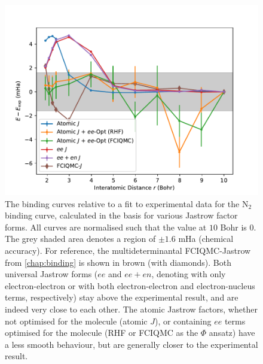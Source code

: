 \begin{figure}[htbp]
    \centering
    \includegraphics[width=\textwidth]{figures/universal/residuals}
    \caption{The binding curves relative to a fit to experimental data\supercite{leroyAccurate2006} for the N$_2$ binding curve, calculated in the \avtz basis for various Jastrow factor forms. All curves are normalised such that the value at $10$ Bohr is $0$. The grey shaded area denotes a region of $\pm 1.6$ mHa (chemical accuracy). For reference, the multideterminantal FCIQMC-Jastrow from \autoref{chap:binding} is shown in brown (with diamonds). Both universal Jastrow forms ($ee$ and $ee+en$, denoting with only electron-electron or with both electron-electron and electron-nucleus terms, respectively) stay above the experimental result, and are indeed very close to each other. The atomic Jastrow factors, whether not optimised for the molecule (atomic $J$), or containing $ee$ terms optimised for the molecule (RHF or FCIQMC as the $\Phi$ ansatz) have a less smooth behaviour, but are generally closer to the experimental result. }
    \label{fig:binding-universal-experiment}
\end{figure}


